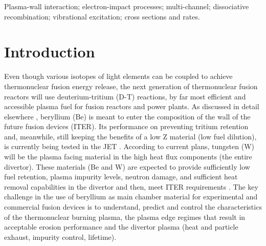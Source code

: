 \documentclass[reviewcopy]{elsarticle}
\begin{document}
\begin{frontmatter}
\begin{keyword}
Plasma-wall interaction;
		electron-impact processes;
		multi-channel;
		dissociative recombination;
		vibrational excitation;
		cross sections and rates.
\end{keyword}

\end{frontmatter}

\clearpage

\tableofcontents
\listofDtables
\listofDfigures

\clearpage

\section{Introduction}

Even though various isotopes of light elements can be coupled to achieve
thermonuclear fusion energy release, the next generation of thermonuclear fusion
reactors will use deuterium-tritium (D-T) reactions, by far most efficient and
accessible plasma fuel for fusion reactors and power plants. As discussed in
detail elsewhere \cite{federici2001,Pamela2007,Reiter2012,Anderl1999,shimada2007,Brooks1997}, beryllium (Be) is meant to enter the composition of the wall of the future fusion devices (ITER).
Its performance on preventing tritium retention and, meanwhile, still
keeping the benefits of a low Z material (low fuel dilution), is currently being
tested in the JET \cite{Reiter2012,Anderl1999}.
According to current plans, tungsten (W) will be the plasma facing material in
the high heat flux components (the entire divertor). These materials (Be and W)
are expected to provide sufficiently low fuel retention, plasma impurity levels,
neutron damage, and sufficient heat removal capabilities in the divertor and
then, meet ITER requirements \cite{Pamela2007}. 
The key challenge in the use of beryllium as main chamber material
for experimental and commercial fusion devices is to understand, predict and
control the characteristics of the thermonuclear burning plasma, the plasma edge
regimes that result in acceptable erosion performance and the divertor plasma
(heat and particle exhaust, impurity control, lifetime). 
\end{document}
